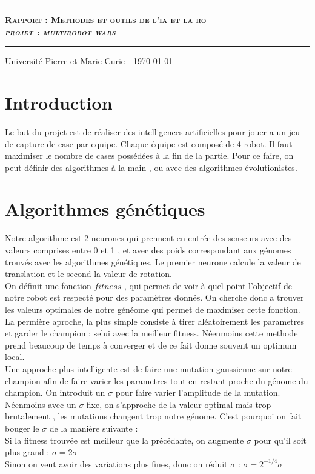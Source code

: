 \documentclass[11pt]{article}
\date{}
\author{\scshape Becirspahic Lucas}
\makeatletter
\renewcommand{\maketitle}{
\begin{titlepage}%
    \vspace*{7cm}
	\hrule
	\begin{center}
		{\bfseries \scshape {\huge Rapport : Methodes et outils de l'ia et la ro} \\[1em] {\itshape \LARGE  projet : multirobot wars}}
	\end{center}
	\vspace{1em}
	\hrule
	 \begin{center}
      \Large \@author \par
    \end{center}	
    \vfill
	\begin{center}
	Université Pierre et Marie Curie - \today
	\end{center}
    \end{titlepage}
}
\makeatother
\begin{document}
\maketitle




\section{Introduction}

Le but du projet est de réaliser des intelligences artificielles pour jouer a un jeu de capture de case par equipe. Chaque équipe est composé de 4 robot. Il faut maximiser le nombre de cases possédées à la fin de la partie. Pour ce faire, on peut définir des algorithmes à la main , ou avec des algorithmes évolutionistes.


\section{Algorithmes génétiques}

Notre algorithme est 2 neurones qui prennent en entrée des senseurs avec des valeurs comprises entre 0 et 1 , et avec des poids correspondant aux génomes trouvés avec les algorithmes génétiques. Le premier neurone calcule la valeur de translation et le second la valeur de rotation. \\

On définit une fonction $fitness$ , qui permet de voir à quel point l'objectif de notre robot est respecté pour des paramètres donnés. On cherche donc a trouver les valeurs optimales de notre généome qui permet de maximiser cette fonction. \\
La permière aproche, la plus simple consiste à tirer aléatoirement les parametres et garder le champion : selui avec la meilleur fitness. Néenmoins cette methode prend beaucoup de temps à converger et de ce fait donne souvent un optimum local. \\
Une approche plus intelligente est de faire une mutation gaussienne sur notre champion afin de faire varier les parametres tout en restant proche du génome du champion. On introduit un $\sigma$ pour faire varier l'amplitude de la mutation. Néenmoins avec un $\sigma$ fixe, on s'approche de la valeur optimal mais trop brutalement , les mutations changent trop notre génome. C'est pourquoi on fait bouger le $\sigma$ de la manière suivante : \\
Si la fitness trouvée est meilleur que la précédante, on augmente $\sigma$ pour qu'il soit plus grand : 
$\sigma = 2\sigma$ \\
Sinon on veut avoir des variations plus fines, donc on réduit $\sigma$ : 
$\sigma = 2^{-1/4}\sigma$ \\
\end{document}
